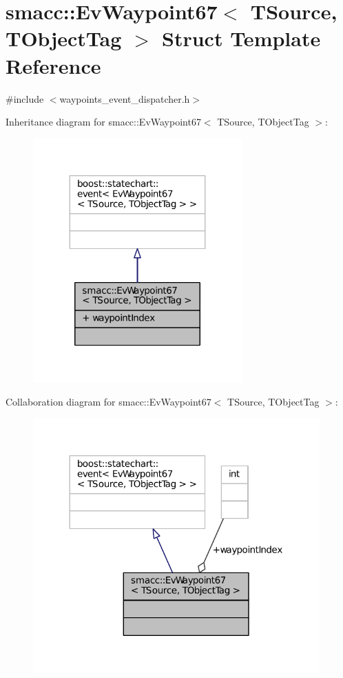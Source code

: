 \hypertarget{structsmacc_1_1EvWaypoint67}{}\section{smacc\+:\+:Ev\+Waypoint67$<$ T\+Source, T\+Object\+Tag $>$ Struct Template Reference}
\label{structsmacc_1_1EvWaypoint67}


{\ttfamily \#include $<$waypoints\+\_\+event\+\_\+dispatcher.\+h$>$}



Inheritance diagram for smacc\+:\+:Ev\+Waypoint67$<$ T\+Source, T\+Object\+Tag $>$\+:
\nopagebreak
\begin{figure}[H]
\begin{center}
\leavevmode
\includegraphics[width=227pt]{structsmacc_1_1EvWaypoint67__inherit__graph}
\end{center}
\end{figure}


Collaboration diagram for smacc\+:\+:Ev\+Waypoint67$<$ T\+Source, T\+Object\+Tag $>$\+:
\nopagebreak
\begin{figure}[H]
\begin{center}
\leavevmode
\includegraphics[width=312pt]{structsmacc_1_1EvWaypoint67__coll__graph}
\end{center}
\end{figure}
